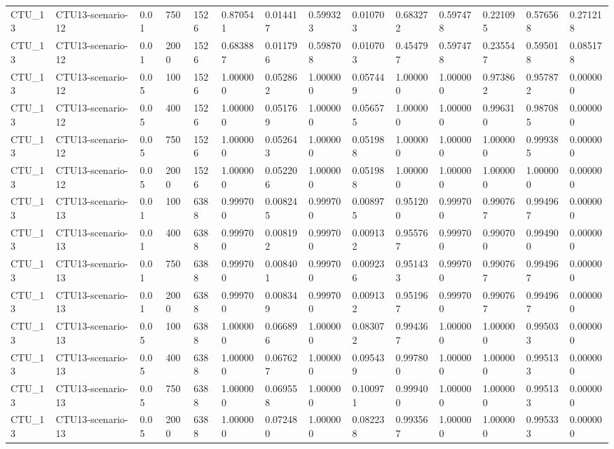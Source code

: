 \begin{tabular}{llllllllllllll}
CTU\_13 & CTU13-scenario-12 & 0.01 & 750 & 1526 & 0.870541 & 0.014417 & 0.599323 & 0.010703 & 0.683272 & 0.597478 & 0.221095 & 0.576568 & 0.271218 \\
CTU\_13 & CTU13-scenario-12 & 0.01 & 2000 & 1526 & 0.683887 & 0.011796 & 0.598708 & 0.010703 & 0.454797 & 0.597478 & 0.235547 & 0.595018 & 0.085178 \\
CTU\_13 & CTU13-scenario-12 & 0.05 & 100 & 1526 & 1.000000 & 0.052862 & 1.000000 & 0.057449 & 1.000000 & 1.000000 & 0.973862 & 0.957872 & 0.000000 \\
CTU\_13 & CTU13-scenario-12 & 0.05 & 400 & 1526 & 1.000000 & 0.051769 & 1.000000 & 0.056575 & 1.000000 & 1.000000 & 0.996310 & 0.987085 & 0.000000 \\
CTU\_13 & CTU13-scenario-12 & 0.05 & 750 & 1526 & 1.000000 & 0.052643 & 1.000000 & 0.051988 & 1.000000 & 1.000000 & 1.000000 & 0.999385 & 0.000000 \\
CTU\_13 & CTU13-scenario-12 & 0.05 & 2000 & 1526 & 1.000000 & 0.052206 & 1.000000 & 0.051988 & 1.000000 & 1.000000 & 1.000000 & 1.000000 & 0.000000 \\
CTU\_13 & CTU13-scenario-13 & 0.01 & 100 & 6388 & 0.999700 & 0.008245 & 0.999700 & 0.008975 & 0.951200 & 0.999700 & 0.990767 & 0.994967 & 0.000000 \\
CTU\_13 & CTU13-scenario-13 & 0.01 & 400 & 6388 & 0.999700 & 0.008192 & 0.999700 & 0.009132 & 0.955767 & 0.999700 & 0.990700 & 0.994900 & 0.000000 \\
CTU\_13 & CTU13-scenario-13 & 0.01 & 750 & 6388 & 0.999700 & 0.008401 & 0.999700 & 0.009236 & 0.951433 & 0.999700 & 0.990767 & 0.994967 & 0.000000 \\
CTU\_13 & CTU13-scenario-13 & 0.01 & 2000 & 6388 & 0.999700 & 0.008349 & 0.999700 & 0.009132 & 0.951967 & 0.999700 & 0.990767 & 0.994967 & 0.000000 \\
CTU\_13 & CTU13-scenario-13 & 0.05 & 100 & 6388 & 1.000000 & 0.066896 & 1.000000 & 0.083072 & 0.994367 & 1.000000 & 1.000000 & 0.995033 & 0.000000 \\
CTU\_13 & CTU13-scenario-13 & 0.05 & 400 & 6388 & 1.000000 & 0.067627 & 1.000000 & 0.095439 & 0.997800 & 1.000000 & 1.000000 & 0.995133 & 0.000000 \\
CTU\_13 & CTU13-scenario-13 & 0.05 & 750 & 6388 & 1.000000 & 0.069558 & 1.000000 & 0.100971 & 0.999400 & 1.000000 & 1.000000 & 0.995133 & 0.000000 \\
CTU\_13 & CTU13-scenario-13 & 0.05 & 2000 & 6388 & 1.000000 & 0.072480 & 1.000000 & 0.082238 & 0.993567 & 1.000000 & 1.000000 & 0.995333 & 0.000000 \\

\end{tabular}
